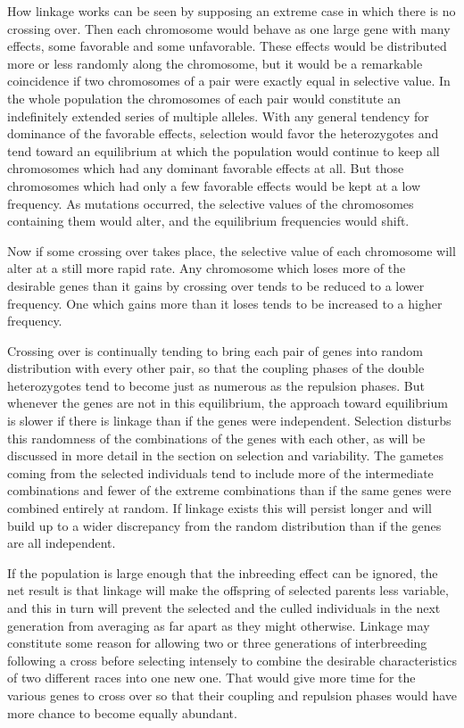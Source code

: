 How linkage works can be seen by supposing an extreme case in
which there is no crossing over. Then each chromosome would behave
as one large gene with many effects, some favorable and some unfavorable.
These effects would be distributed more or less randomly along
the chromosome, but it would be a remarkable coincidence if two
chromosomes of a pair were exactly equal in selective value. In the
whole population the chromosomes of each pair would constitute an
indefinitely extended series of multiple alleles. With any general tendency
for dominance of the favorable effects, selection would favor the
heterozygotes and tend toward an equilibrium at which the population
would continue to keep all chromosomes which had any dominant
favorable effects at all. But those chromosomes which had only a few
favorable effects would be kept at a low frequency. As mutations
occurred, the selective values of the chromosomes containing them
would alter, and the equilibrium frequencies would shift.

Now if some crossing over takes place, the selective value of each
chromosome will alter at a still more rapid rate. Any chromosome
which loses more of the desirable genes than it gains by crossing over
tends to be reduced to a lower frequency. One which gains more than it
loses tends to be increased to a higher frequency.

Crossing over is continually tending to bring each pair of genes into
random distribution with every other pair, so that the
coupling phases
of the double heterozygotes tend to become just as numerous as the
repulsion phases. But whenever the genes are not in this equilibrium,
the approach toward equilibrium is slower if there is linkage than if the
genes were independent. Selection disturbs this randomness of the
combinations of the genes with each other, as will be discussed in more
detail in the section on selection and variability. The gametes coming
from the selected individuals tend to include more of the intermediate
combinations and fewer of the extreme combinations than if the same
genes were combined entirely at random. If linkage exists this will persist
longer and will build up to a wider discrepancy from the random
distribution than if the genes are all independent.

If the population is large enough that the inbreeding effect can be
ignored, the net result is that linkage will make the offspring of selected
parents less variable, and this in turn will prevent the selected and the
culled individuals in the next generation from averaging as far apart as
they might otherwise. Linkage may constitute some reason for allowing
two or three generations of interbreeding following a cross before selecting
intensely to combine the desirable characteristics of two different
races into one new one. That would give more time for the various
genes to cross over so that their coupling and repulsion phases would
have more chance to become equally abundant.

